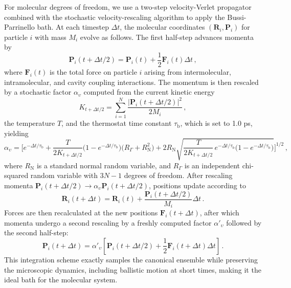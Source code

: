 For molecular degrees of freedom, we use a two-step velocity-Verlet propagator combined with the stochastic velocity-rescaling algorithm to apply the Bussi-Parrinello bath.\cite{bussi2007canonical,bussi2008stochastic}
At each timestep $\Delta t$, the molecular coordinates $(\bm{R}_i, \bm{P}_i)$ for particle $i$ with mass $M_i$ evolve as follows.
The first half-step advances momenta by
\begin{equation}
\bm{P}_i\left(t + \Delta t/2\right) = \bm{P}_i(t) + \frac{1}{2} \bm{F}_i(t) \Delta t \,,
\end{equation}
where $\bm{F}_i(t)$ is the total force on particle $i$ arising from intermolecular, intramolecular, and cavity coupling interactions.
The momentum is then rescaled by a stochastic factor $\alpha_\upsilon$ computed from the current kinetic energy
\begin{equation}
K_{t+\Delta t/2} = \sum_{i=1}^{N} \frac{|\bm{P}_i(t + \Delta t/2)|^2}{2M_i} \,,
\end{equation}
the temperature $T$, and the thermostat time constant $\tau_\mathrm{b}$, which is set to 1.0 ps, yielding %
\begin{equation}
\alpha_\upsilon =
\biggl[
e^{-\Delta t/\tau_\mathrm{b}}
+ \frac{T}{2K_{t+\Delta t/2}}
\bigl(1 - e^{-\Delta t/\tau_\mathrm{b}}\bigr)\bigl(R_\Gamma + R_\mathrm{N}^2\bigr)
+ 2R_\mathrm{N}
\sqrt{
\frac{T}{2K_{t+\Delta t/2}}\,
e^{-\Delta t/\tau_\mathrm{b}}\bigl(1 - e^{-\Delta t/\tau_\mathrm{b}}\bigr)
}
\biggr]^{1/2} \,,
\end{equation}
where $R_\mathrm{N}$ is a standard normal random variable, and $R_\Gamma$ is an independent chi-squared random variable with $3N-1$ degrees of freedom.
After rescaling momenta $\bm{P}_i(t + \Delta t/2) \to \alpha_\upsilon \bm{P}_i(t + \Delta t/2)$, positions update according to
\begin{equation}
\bm{R}_i(t + \Delta t) = \bm{R}_i(t) + \frac{\bm{P}_i(t + \Delta t/2)}{M_i} \Delta t \,.
\end{equation}
Forces are then recalculated at the new positions $\bm{F}_i(t + \Delta t)$, after which momenta undergo a second rescaling by a freshly computed factor $\alpha'_\upsilon$ followed by the second half-step:
\begin{equation}
\bm{P}_i(t + \Delta t) = \alpha'_\upsilon \left[\bm{P}_i(t + \Delta t/2) + \frac{1}{2} \bm{F}_i(t + \Delta t) \Delta t\right] \,.
\end{equation}
This integration scheme exactly samples the canonical ensemble while preserving the microscopic dynamics, including ballistic motion at short times, making it the ideal bath for the molecular system. 

